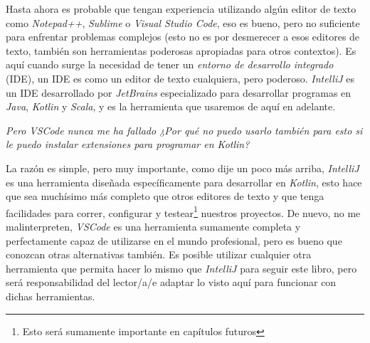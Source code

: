 Hasta ahora es probable que tengan experiencia utilizando algún editor de texto como 
\textit{Notepad++}, \textit{Sublime} o \textit{Visual Studio Code}, eso es bueno, pero no 
suficiente para enfrentar problemas complejos (esto no es por desmerecer a esos editores de 
texto, también son herramientas poderosas apropiadas para otros contextos).
Es aquí cuando surge la necesidad de tener un \textit{entorno de desarrollo integrado} (IDE),
un IDE es como un editor de texto cualquiera, pero poderoso.
\textit{IntelliJ} es un IDE desarrollado por \textit{JetBrains} especializado para desarrollar
programas en \textit{Java}, \textit{Kotlin} y \textit{Scala}, y es la herramienta que usaremos de 
aquí en adelante.
\begin{center}
  \textit{
    Pero VSCode nunca me ha fallado ¿Por qué no puedo usarlo también para esto si le puedo 
    instalar extensiones para programar en Kotlin?
  }
\end{center}

La razón es simple, pero muy importante, como dije un poco más arriba, \textit{IntelliJ} es una
herramienta diseñada específicamente para desarrollar en \textit{Kotlin}, esto hace que sea 
muchísimo más completo que otros editores de texto y que tenga facilidades para correr, configurar y 
testear\footnote{Esto será sumamente importante en capítulos futuros} nuestros proyectos.
De nuevo, no me malinterpreten, \textit{VSCode} es una herramienta sumamente completa y 
perfectamente capaz de utilizarse en el mundo profesional, pero es bueno que conozcan otras 
alternativas también.
Es posible utilizar cualquier otra herramienta que permita hacer lo mismo que \textit{IntelliJ}
para seguir este libro, pero será responsabilidad del lector/a/e adaptar lo visto aquí para 
funcionar con dichas herramientas.\footnotemark

